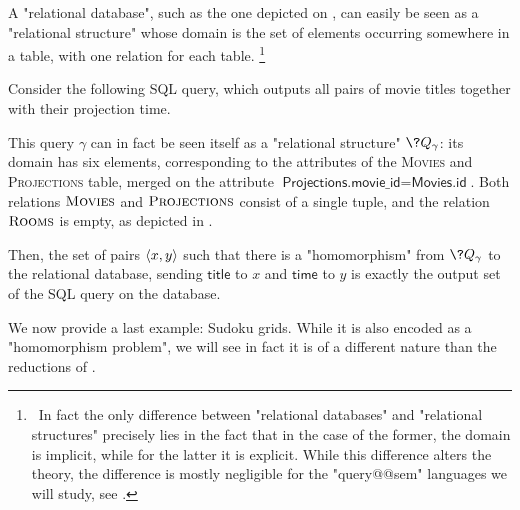 \begin{example}
	\AP\label{ex:sql-as-hom}
	A "relational database", such as the one depicted on
	, can easily be seen as a "relational structure"
	whose domain is the set of elements occurring somewhere in a table,
	with one relation for each table.%
	\footnote{~In fact the only difference between "relational databases" and "relational structures"
	precisely lies in the fact that in the case of the former, the domain is implicit,
	while for the latter it is explicit.
	While this difference alters the theory, the difference is mostly negligible
	for the "query@@sem" languages we will study, see .}

	Consider the following SQL query, which outputs all pairs
	of movie titles together with their projection time.
	

	This query $\gamma$ can in fact be seen itself as a "relational structure" $\?Q_\gamma$:
	its domain has six elements, corresponding to the attributes of
	the \textsc{Movies} and \textsc{Projections} table, merged on the attribute
	$\textsf{Projections.movie\_id} = \textsf{Movies.id}$.
	Both relations $\textsc{Movies}$ and $\textsc{Projections}$ consist of a single tuple,
	and the relation $\textsc{Rooms}$ is empty, as depicted in .

	Then, the set of pairs $\langle x, y\rangle$
	such that there is a "homomorphism" from $\?Q_\gamma$ to the relational database,
	sending $\textsf{title}$ to $x$ and $\textsf{time}$ to $y$
	is exactly the output set of the SQL query on the database.
\end{example}

We now provide a last example: Sudoku grids. While it is also encoded
as a "homomorphism problem", we will see in fact it
is of a different nature than the reductions of .

